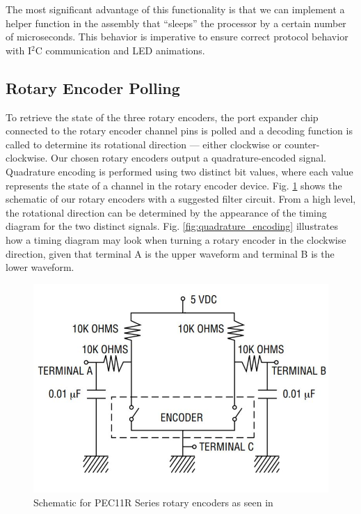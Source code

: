 \documentclass[conference]{IEEEtran}
\begin{document}
The most significant advantage of this functionality is that we can implement a helper function in the assembly that ``sleeps'' the processor by a certain number of microseconds. This behavior is imperative to ensure correct protocol behavior with I$^2$C communication and LED animations.

\subsection{Rotary Encoder Polling}
To retrieve the state of the three rotary encoders, the port expander chip connected to the rotary encoder channel pins is polled and a decoding function is called to determine its rotational direction --- either clockwise or counter-clockwise. Our chosen rotary encoders output a quadrature-encoded signal. Quadrature encoding is performed using two distinct bit values, where each value represents the state of a channel in the rotary encoder device. Fig. \ref{fig:rotary_encoder_schematic} shows the schematic of our rotary encoders with a suggested filter circuit. From a high level, the rotational direction can be determined by the appearance of the timing diagram for the two distinct signals. Fig. \ref{fig:quadrature_encoding} illustrates how a timing diagram may look when turning a rotary encoder in the clockwise direction, given that terminal A is the upper waveform and terminal B is the lower waveform.

\begin{figure}[h]
    \centering
    \includegraphics[scale=0.4]{./resources/figures/rotary_encoder_schematic.jpg}
    \caption{Schematic for PEC11R Series rotary encoders as seen in \cite{cite:rotary_encoders}}
    \label{fig:rotary_encoder_schematic}
\end{figure}
\end{document}
